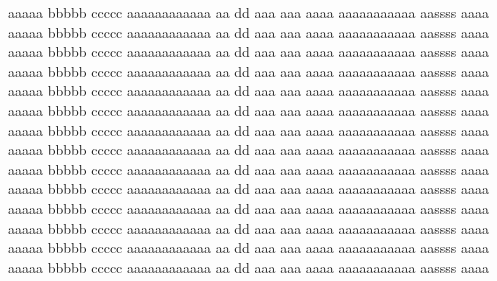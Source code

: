 \begin{agradecimentos}
aaaaa bbbbb ccccc aaaaaaaaaaaa aa dd  aaa aaa aaaa aaaaaaaaaaa aassss aaaa 
aaaaa bbbbb ccccc aaaaaaaaaaaa aa dd  aaa aaa aaaa aaaaaaaaaaa aassss aaaa
aaaaa bbbbb ccccc aaaaaaaaaaaa aa dd  aaa aaa aaaa aaaaaaaaaaa aassss aaaa
aaaaa bbbbb ccccc aaaaaaaaaaaa aa dd  aaa aaa aaaa aaaaaaaaaaa aassss aaaa
aaaaa bbbbb ccccc aaaaaaaaaaaa aa dd  aaa aaa aaaa aaaaaaaaaaa aassss aaaa
aaaaa bbbbb ccccc aaaaaaaaaaaa aa dd  aaa aaa aaaa aaaaaaaaaaa aassss aaaa
aaaaa bbbbb ccccc aaaaaaaaaaaa aa dd  aaa aaa aaaa aaaaaaaaaaa aassss aaaa
aaaaa bbbbb ccccc aaaaaaaaaaaa aa dd  aaa aaa aaaa aaaaaaaaaaa aassss aaaa
aaaaa bbbbb ccccc aaaaaaaaaaaa aa dd  aaa aaa aaaa aaaaaaaaaaa aassss aaaa
aaaaa bbbbb ccccc aaaaaaaaaaaa aa dd  aaa aaa aaaa aaaaaaaaaaa aassss aaaa
aaaaa bbbbb ccccc aaaaaaaaaaaa aa dd  aaa aaa aaaa aaaaaaaaaaa aassss aaaa
aaaaa bbbbb ccccc aaaaaaaaaaaa aa dd  aaa aaa aaaa aaaaaaaaaaa aassss aaaa
aaaaa bbbbb ccccc aaaaaaaaaaaa aa dd  aaa aaa aaaa aaaaaaaaaaa aassss aaaa
aaaaa bbbbb ccccc aaaaaaaaaaaa aa dd  aaa aaa aaaa aaaaaaaaaaa aassss aaaa
\end{agradecimentos}